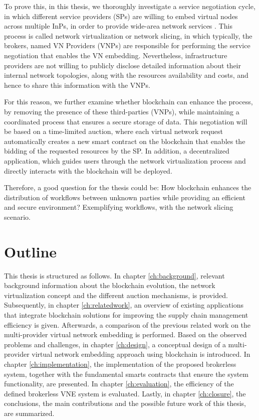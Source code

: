 To prove this, in this thesis, we thoroughly investigate a service negotiation cycle, in which different service providers (SPs) are willing to embed virtual nodes across multiple InPs, in order to provide wide-area network services \cite{dietrich2015multi}. This process is called network virtualization or network slicing, in which typically, the brokers, named VN Providers (VNPs) are responsible for performing the service negotiation that enables the VN embedding. Nevertheless, infrastructure providers are not willing to publicly disclose detailed information about their internal network topologies, along with the resources availability and costs, and hence to share this information with the VNPs.

For this reason, we further examine whether blockchain can enhance the process, by removing the presence of these third-parties (VNPs), while maintaining a coordinated process that ensures a secure storage of data. This negotiation will be based on a time-limited auction, where each virtual network request automatically creates a new smart contract on the blockchain that enables the bidding of the requested resources by the SP. In addition, a decentralized application, which guides users through the network virtualization process and directly interacts with the blockchain will be deployed.

Therefore, a good question for the thesis could be: How blockchain enhances the distribution of workflows between unknown parties while providing an efficient and secure environment? Exemplifying workflows, with the network slicing scenario.

\section{Outline}

This thesis is structured as follows. In chapter \ref{ch:background}, relevant background information about the blockchain evolution, the network virtualization concept and the different auction mechanisms, is provided. Subsequently, in chapter \ref{ch:relatedwork}, an overview of existing applications that integrate blockchain solutions for improving the supply chain management efficiency is given. Afterwards, a comparison of the previous related work on the multi-provider virtual network embedding is performed. Based on the observed problems and challenges, in chapter \ref{ch:design}, a conceptual design of a multi-provider virtual network embedding approach using blockchain is introduced. In chapter \ref{ch:implementation}, the implementation of the proposed brokerless system, together with the fundamental smarts contracts that ensure the system functionality, are presented. In chapter \ref{ch:evaluation}, the efficiency of the defined brokerless VNE system is evaluated. Lastly, in chapter \ref{ch:closure}, the conclusions, the main contributions and the possible future work of this thesis, are summarized.


